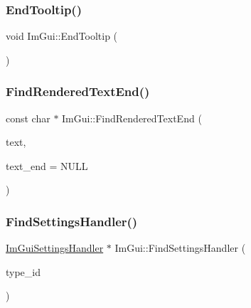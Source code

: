 \hypertarget{namespace_im_gui_ac8d75c160cfdf43d512f773ca133a1c6}{}\label{namespace_im_gui_ac8d75c160cfdf43d512f773ca133a1c6} 
\subsubsection{\texorpdfstring{End\+Tooltip()}{EndTooltip()}}
{\footnotesize\ttfamily void Im\+Gui\+::\+End\+Tooltip (\begin{DoxyParamCaption}{ }\end{DoxyParamCaption})}

\hypertarget{namespace_im_gui_a7671e1dbc803a31b06081b52a771d83f}{}\label{namespace_im_gui_a7671e1dbc803a31b06081b52a771d83f} 
\subsubsection{\texorpdfstring{Find\+Rendered\+Text\+End()}{FindRenderedTextEnd()}}
{\footnotesize\ttfamily const char $\ast$ Im\+Gui\+::\+Find\+Rendered\+Text\+End (\begin{DoxyParamCaption}\item[{const char $\ast$}]{text,  }\item[{const char $\ast$}]{text\+\_\+end = {\ttfamily NULL} }\end{DoxyParamCaption})}

\hypertarget{namespace_im_gui_aec16678be3525f44cd32c1d84ac2d592}{}\label{namespace_im_gui_aec16678be3525f44cd32c1d84ac2d592} 
\subsubsection{\texorpdfstring{Find\+Settings\+Handler()}{FindSettingsHandler()}}
{\footnotesize\ttfamily \hyperlink{struct_im_gui_settings_handler}{Im\+Gui\+Settings\+Handler} $\ast$ Im\+Gui\+::\+Find\+Settings\+Handler (\begin{DoxyParamCaption}\item[{Im\+Gui\+ID}]{type\+\_\+id }\end{DoxyParamCaption})}

\hypertarget{namespace_im_gui_abca25f22c02e73d5eb2e9c72c4557813}{}\label{namespace_im_gui_abca25f22c02e73d5eb2e9c72c4557813} 
